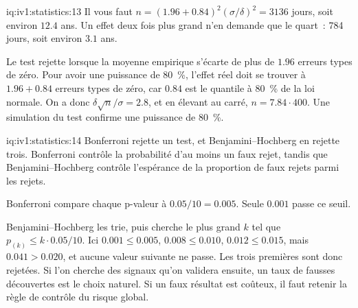 \begin{solution}{iq:iv1:statistics:13}
Il vous faut $n = (1.96 + 0.84)^2(\sigma/\delta)^2 = 3136$ jours, soit environ $12.4$ ans. Un effet deux fois plus grand n'en demande que le quart~: 784 jours, soit environ $3.1$ ans.

Le test rejette lorsque la moyenne empirique s'écarte de plus de $1.96$ erreurs types de zéro. Pour avoir une puissance de 80~\%, l'effet réel doit se trouver à $1.96 + 0.84$ erreurs types de zéro, car $0.84$ est le quantile à 80~\% de la loi normale. On a donc $\delta\sqrt{n}/\sigma = 2.8$, et en élevant au carré, $n = 7.84 \cdot 400$. Une simulation du test confirme une puissance de 80~\%.

\end{solution}

\begin{solution}{iq:iv1:statistics:14}
Bonferroni rejette un test, et Benjamini--Hochberg en rejette trois. Bonferroni contrôle la probabilité d'au moins un faux rejet, tandis que Benjamini--Hochberg contrôle l'espérance de la proportion de faux rejets parmi les rejets.

Bonferroni compare chaque p-valeur à $0.05/10 = 0.005$. Seule $0.001$ passe ce seuil.

Benjamini--Hochberg les trie, puis cherche le plus grand $k$ tel que $p_{(k)} \le k \cdot 0.05/10$. Ici $0.001 \le 0.005$, $0.008 \le 0.010$, $0.012 \le 0.015$, mais $0.041 > 0.020$, et aucune valeur suivante ne passe. Les trois premières sont donc rejetées. Si l'on cherche des signaux qu'on validera ensuite, un taux de fausses découvertes est le choix naturel. Si un faux résultat est coûteux, il faut retenir la règle de contrôle du risque global.

\end{solution}

